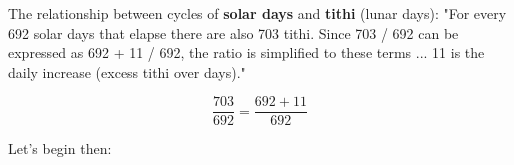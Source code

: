\documentclass[11pt,oneside]{memoir-article}
\begin{document}
\newcommand\cheatsheetPar{\marginpar{\vspace*{1\baselineskip}\footnotesize\cheatsheetText}}

\makeatother


\clearpage

The relationship between cycles of \textbf{solar days} and \textbf{tithi} (lunar days):
"For every 692 solar days that elapse there are also 703 tithi.
Since 703 / 692 can be expressed as 692 + 11 / 692, the ratio is simplified to these terms ...
11 is the daily increase (excess tithi over days)."\autocite[p. 48]{eade1995calendrical}

\begin{equation}
\frac{703}{692} = \frac{692 + 11}{692}
\end{equation}


Let's begin then:

\label{year-properties-formulas}

\cheatsheetPar
\end{document}
